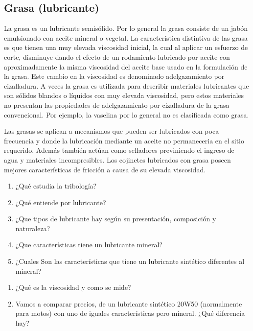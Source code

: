 \subsection{Grasa (lubricante)}


La grasa es un lubricante semisólido. Por lo general la grasa consiste de un jabón emulsionado con aceite mineral o vegetal. La característica distintiva de las grasa es que tienen una muy elevada viscosidad inicial, la cual al aplicar un esfuerzo de corte, disminuye dando el efecto de un rodamiento lubricado por aceite con aproximadamente la misma viscosidad del aceite base usado en la formulación de la grasa. Este cambio en la viscosidad es denominado adelgazamiento por cizalladura. A veces la grasa es utilizada para describir materiales lubricantes que son sólidos blandos o líquidos con muy elevada viscosidad, pero estos materiales no presentan las propiedades de adelgazamiento por cizalladura de la grasa convencional. Por ejemplo, la vaselina por lo general no es clasificada como grasa.

Las grasas se aplican a mecanismos que pueden ser lubricados con poca frecuencia y donde la lubricación mediante un aceite no permaneceria en el sitio requerido. Además también actúan como selladores previniendo el ingreso de agua y materiales incompresibles. Los cojinetes lubricados con grasa poseen mejores características de fricción a causa de su elevada viscosidad.



\newpage
{}
\begin{enumerate}
    \item ¿Qué estudia la tribología? 
    \item ¿Qué entiende por lubricante?
    \item ¿Que tipos de lubricante hay según su presentación, composición y naturaleza?
    \item ¿Que características tiene un lubricante mineral?
    \item ¿Cuales Son las características que tiene un lubricante sintético diferentes al mineral?
\end{enumerate}
\begin{enumerate}
    \item ¿Qué es la viscosidad y como se mide?
    \item Vamos a comparar precios, de un lubricante sintético 20W50 (normalmente para motos) con uno de iguales características pero mineral. ¿Qué diferencia hay?
    
    
    
\end{enumerate}